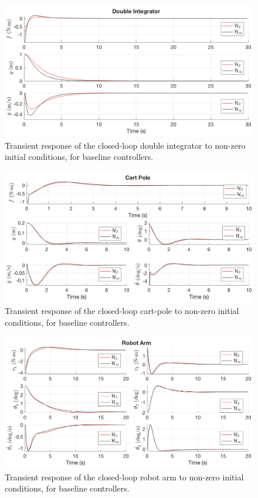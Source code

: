 \begin{figure}[H]
\centering
	\includegraphics[width=\textwidth]{figures/baseline_transient_double_integrator.png}
\caption{Transient response of the closed-loop double integrator to non-zero initial conditions, for baseline controllers.}
\label{fig:baseline_transient_double_integrator}
\end{figure}

\begin{figure}[H]
\centering
	\includegraphics[width=\textwidth]{figures/baseline_transient_cart_pole.png}
\caption{Transient response of the closed-loop cart-pole to non-zero initial conditions, for baseline controllers.}
\label{fig:baseline_transient_cart_pole}
\end{figure}

\begin{figure}[H]
\centering
	\includegraphics[width=\textwidth]{figures/baseline_transient_robot_arm.png}
\caption{Transient response of the closed-loop robot arm to non-zero initial conditions, for baseline controllers.}
\label{fig:baseline_transient_robot_arm}
\end{figure}

